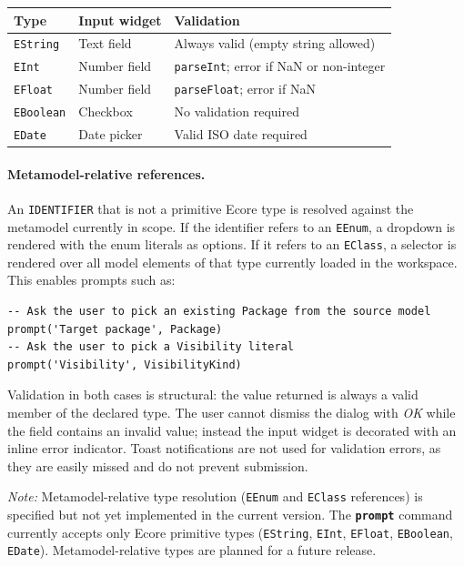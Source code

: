 \documentclass[11pt,a4paper]{article}
\newcommand{\kw}[1]{\texttt{\textbf{#1}}}
\begin{document}
\begin{center}
\begin{tabular}{@{}lll@{}}
\toprule
\textbf{Type} & \textbf{Input widget} & \textbf{Validation} \\
\midrule
\texttt{EString}  & Text field   & Always valid (empty string allowed) \\
\texttt{EInt}     & Number field & \texttt{parseInt}; error if NaN or non-integer \\
\texttt{EFloat}   & Number field & \texttt{parseFloat}; error if NaN \\
\texttt{EBoolean} & Checkbox     & No validation required \\
\texttt{EDate}    & Date picker  & Valid ISO date required \\
\bottomrule
\end{tabular}
\end{center}
 
\paragraph{Metamodel-relative references.} An \texttt{IDENTIFIER} that is
not a primitive Ecore type is resolved against the metamodel currently in
scope. If the identifier refers to an \texttt{EEnum}, a dropdown is
rendered with the enum literals as options. If it refers to an
\texttt{EClass}, a selector is rendered over all model elements of that
type currently loaded in the workspace. This enables prompts such as:
 
\begin{lstlisting}[style=jjtl,numbers=none]
-- Ask the user to pick an existing Package from the source model
prompt('Target package', Package)
-- Ask the user to pick a Visibility literal
prompt('Visibility', VisibilityKind)
\end{lstlisting}
 
Validation in both cases is structural: the value returned is always a
valid member of the declared type. The user cannot dismiss the dialog with
\emph{OK} while the field contains an invalid value; instead the input
widget is decorated with an inline error indicator. Toast notifications
are not used for validation errors, as they are easily missed and do not
prevent submission.

\emph{Note:} Metamodel-relative type resolution (\texttt{EEnum} and \texttt{EClass} references) is specified but not yet implemented in the current version. The \kw{prompt} command currently accepts only Ecore primitive types (\texttt{EString}, \texttt{EInt}, \texttt{EFloat}, \texttt{EBoolean}, \texttt{EDate}). Metamodel-relative types are planned for a future release.
 
\end{document}
